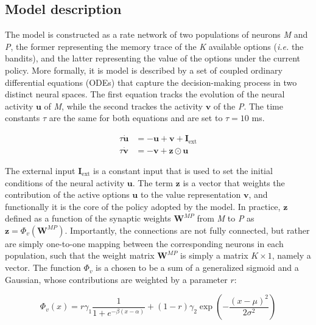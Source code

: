
\subsection{Model description}
The model is constructed as a rate network of two populations of neurons \textit{M} and \textit{P}, the former representing the memory trace of the \textit{K} available options (\textit{i.e.} the bandits), and the latter representing the value of the options under the current policy.
More formally, it is model is described by a set of coupled ordinary differential equations (ODEs) that capture the decision-making process in two distinct neural spaces.
The first equation tracks the evolution of the neural activity $\textbf{u}$ of \textit{M}, while the second trackes the activity $\textbf{v}$ of the \textit{P}. The time constants $\tau$ are the same for both equations and are set to $\tau = 10$ ms.


\begin{equation}
\begin{aligned}
    \tau \dot{\textbf{u}}&= -\textbf{u} + \textbf{v} + \textbf{I}_{\text{ext}} \\
    \tau \dot{\textbf{v}}&= -\textbf{v} + \textbf{z} \odot\textbf{u}
\end{aligned}
\end{equation}

\noindent The external input $\textbf{I}_{\text{ext}}$ is a constant input that is used to set the initial conditions of the neural activity $\textbf{u}$.
The term $\textbf{z}$ is a vector that weights the contribution of the active options $\textbf{u}$ to the value representation $\textbf{v}$, and functionally it is the core of the policy adopted by the model.
In practice, $\textbf{z}$ defined as a function of the synaptic weights $\textbf{W}^{MP}$ from \textit{M} to \textit{P} as $\textbf{z} = \Phi_v(\textbf{W}^{MP})$. Importantly, the connections are not fully connected, but rather are simply one-to-one mapping between the corresponding neurons in each
population, such that the weight matrix $\textbf{W}^{MP}$ is simply a matrix $K\times 1$, namely a vector.
The function $\Phi_v$ is a chosen to be a sum of a generalized sigmoid and a Gaussian, whose contributions are weighted by a parameter $r$:

\begin{equation*}
    \Phi_v(x) = r\gamma_{1} \frac{1}{1 + e^{-\beta(x-\alpha)}} + (1-r)\gamma_{2} \exp\left(-\frac{(x-\mu)^2}{2\sigma^2}\right)
\end{equation*}

